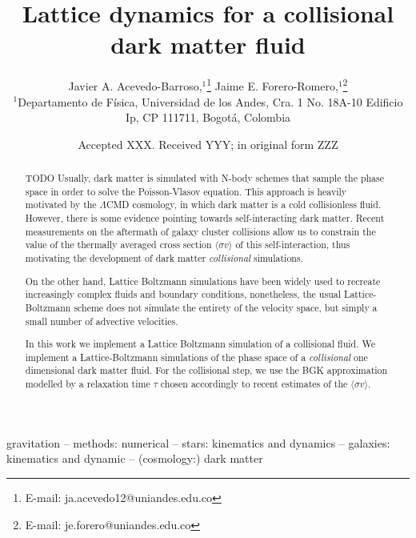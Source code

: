 \documentclass[fleqn,usenatbib]{mnras}
\title[Collisional lattice dynamics]{Lattice dynamics for a collisional dark matter fluid}
\author[J. A. Acevedo-Barroso \& J. E. Forero-Romero]{
Javier A. Acevedo-Barroso,$^{1}$\thanks{E-mail: ja.acevedo12@uniandes.edu.co}
Jaime E. Forero-Romero,$^{1}$\thanks{E-mail: je.forero@uniandes.edu.co}
\\
$^{1}$Departamento de F\'isica, Universidad de los Andes, Cra. 1 No. 18A-10 Edificio Ip, CP 111711, Bogot\'a, Colombia\\
}
\date{Accepted XXX. Received YYY; in original form ZZZ}
\newcommand{\crosssection}{\langle \sigma v \rangle}
\begin{document}
\label{firstpage}
\pagerange{\pageref{firstpage}--\pageref{lastpage}}
\maketitle

\begin{abstract}
TODO
Usually, dark matter is simulated with N-body schemes that sample the phase space in order to solve the Poisson-Vlasov equation. This approach is heavily motivated by the $\Lambda$CMD cosmology, in which dark matter is a cold collisionless fluid.
However, there is some evidence pointing towards self-interacting dark matter. Recent measurements on the aftermath of galaxy cluster collisions allow us to constrain the value of the thermally averaged cross section $\crosssection$ of this self-interaction, thus motivating the development of dark matter \emph{collisional} simulations.

On the other hand, Lattice Boltzmann simulations have been widely used to recreate increasingly complex fluids and boundary conditions, nonetheless, the usual Lattice-Boltzmann scheme does not simulate the entirety of the velocity space, but simply a small number of advective velocities.

In this work we implement a Lattice Boltzmann simulation of a collisional fluid. We implement a Lattice-Boltzmann simulations of the phase space of a \emph{collisional} one dimensional dark matter fluid. For the collisional step, we use the BGK approximation modelled by a relaxation time $\tau$ chosen accordingly to recent estimates of the $\crosssection$.
\end{abstract}

\begin{keywords}
gravitation -- methods: numerical -- stars: kinematics and dynamics -- galaxies: kinematics and dynamic -- (cosmology:) dark matter
\end{keywords}


\end{document}
